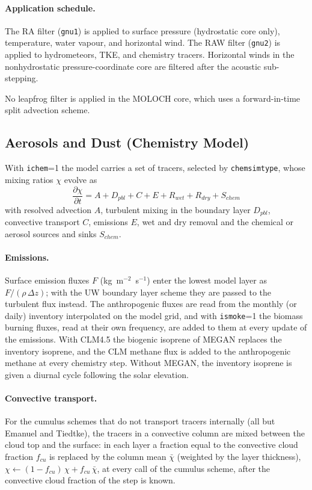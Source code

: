 {\paragraph{Application schedule.}
The RA filter (\texttt{gnu1}) is applied to surface pressure (hydrostatic
core only), temperature, water vapour, and horizontal wind. The RAW filter
(\texttt{gnu2}) is applied to hydrometeors, TKE, and chemistry tracers.
Horizontal winds in the nonhydrostatic pressure-coordinate core are filtered
after the acoustic sub-stepping.

No leapfrog filter is applied in the MOLOCH core, which uses a forward-in-time
split advection scheme.

\subsection{Aerosols and Dust (Chemistry Model)}

With \texttt{ichem}=1 the model carries a set of tracers, selected by
\texttt{chemsimtype}, whose mixing ratios $\chi$ evolve as
\begin{equation}
  \frac{\partial \chi}{\partial t} = A + D_{pbl} + C + E + R_{wet} + R_{dry}
  + S_{chem}
\end{equation}
with resolved advection $A$, turbulent mixing in the boundary layer $D_{pbl}$,
convective transport $C$, emissions $E$, wet and dry removal and the chemical
or aerosol sources and sinks $S_{chem}$.

\paragraph{Emissions.}
Surface emission fluxes $F$ (kg~m$^{-2}$~s$^{-1}$) enter the lowest model
layer as $F/(\rho\,\Delta z)$; with the UW boundary layer scheme they are
passed to the turbulent flux instead. The anthropogenic fluxes are read from
the monthly (or daily) inventory interpolated on the model grid, and with
\texttt{ismoke}=1 the biomass burning fluxes, read at their own frequency, are
added to them at every update of the emissions. With CLM4.5 the biogenic
isoprene of MEGAN replaces the inventory isoprene, and the CLM methane flux is
added to the anthropogenic methane at every chemistry step. Without MEGAN, the
inventory isoprene is given a diurnal cycle following the solar elevation.

\paragraph{Convective transport.}
For the cumulus schemes that do not transport tracers internally (all but
Emanuel and Tiedtke), the tracers in a convective column are mixed between
the cloud top and the surface: in each layer a fraction equal to the
convective cloud fraction $f_{cu}$ is replaced by the column mean
$\bar{\chi}$ (weighted by the layer thickness),
$\chi \leftarrow (1-f_{cu})\,\chi + f_{cu}\,\bar{\chi}$, at every call of the
cumulus scheme, after the convective cloud fraction of the step is known.

}

